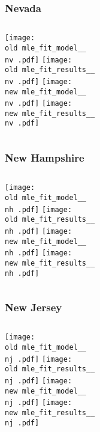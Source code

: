 \documentclass{beamer}
\newcommand{\old}{api-370-prod/pyseir/state_summaries/reports/}
\newcommand{\new}{new/pyseir/state_summaries/reports/}
\newcommand{\nv}{Nevada__32}
\newcommand{\nh}{New Hampshire__33}
\newcommand{\nj}{New Jersey__34}
\begin{document}
\begin{frame}
\frametitle{Nevada}
    \begin{columns}[t]

       \texttt{[image: \\old mle\_fit\_model\_\_\\nv .pdf]}
       \texttt{[image: \\old mle\_fit\_results\_\_\\nv .pdf]}   
       \texttt{[image: \\new mle\_fit\_model\_\_\\nv .pdf]}
       \texttt{[image: \\new mle\_fit\_results\_\_\\nv .pdf]}   
\end{columns}
\end{frame}

\begin{frame}
\frametitle{New Hampshire}
    \begin{columns}[t]

       \texttt{[image: \\old mle\_fit\_model\_\_\\nh .pdf]}
       \texttt{[image: \\old mle\_fit\_results\_\_\\nh .pdf]}   
       \texttt{[image: \\new mle\_fit\_model\_\_\\nh .pdf]}
       \texttt{[image: \\new mle\_fit\_results\_\_\\nh .pdf]}   
\end{columns}
\end{frame}

\begin{frame}
\frametitle{New Jersey}
    \begin{columns}[t]

       \texttt{[image: \\old mle\_fit\_model\_\_\\nj .pdf]}
       \texttt{[image: \\old mle\_fit\_results\_\_\\nj .pdf]}   
       \texttt{[image: \\new mle\_fit\_model\_\_\\nj .pdf]}
       \texttt{[image: \\new mle\_fit\_results\_\_\\nj .pdf]}   
\end{columns}
\end{frame}
\end{document}
